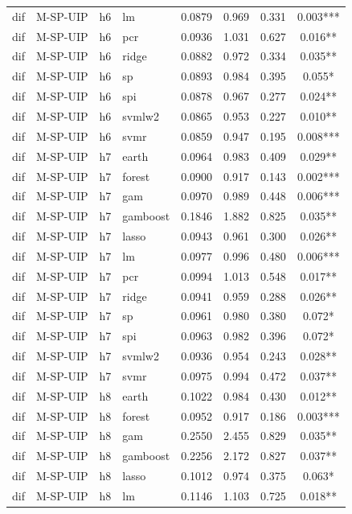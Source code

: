 \begin{ThreePartTable}
\begin{longtable}[t]{llclcccc}
dif & M-SP-UIP & h6 & lm & 0.0879 & 0.969 & 0.331 & 0.003***\\
dif & M-SP-UIP & h6 & pcr & 0.0936 & 1.031 & 0.627 & 0.016**\\
dif & M-SP-UIP & h6 & ridge & 0.0882 & 0.972 & 0.334 & 0.035**\\
dif & M-SP-UIP & h6 & sp & 0.0893 & 0.984 & 0.395 & 0.055*\\
dif & M-SP-UIP & h6 & spi & 0.0878 & 0.967 & 0.277 & 0.024**\\
dif & M-SP-UIP & h6 & svmlw2 & 0.0865 & 0.953 & 0.227 & 0.010**\\
dif & M-SP-UIP & h6 & svmr & 0.0859 & 0.947 & 0.195 & 0.008***\\
\addlinespace
dif & M-SP-UIP & h7 & earth & 0.0964 & 0.983 & 0.409 & 0.029**\\
dif & M-SP-UIP & h7 & forest & 0.0900 & 0.917 & 0.143 & 0.002***\\
dif & M-SP-UIP & h7 & gam & 0.0970 & 0.989 & 0.448 & 0.006***\\
dif & M-SP-UIP & h7 & gamboost & 0.1846 & 1.882 & 0.825 & 0.035**\\
dif & M-SP-UIP & h7 & lasso & 0.0943 & 0.961 & 0.300 & 0.026**\\
dif & M-SP-UIP & h7 & lm & 0.0977 & 0.996 & 0.480 & 0.006***\\
dif & M-SP-UIP & h7 & pcr & 0.0994 & 1.013 & 0.548 & 0.017**\\
dif & M-SP-UIP & h7 & ridge & 0.0941 & 0.959 & 0.288 & 0.026**\\
dif & M-SP-UIP & h7 & sp & 0.0961 & 0.980 & 0.380 & 0.072*\\
dif & M-SP-UIP & h7 & spi & 0.0963 & 0.982 & 0.396 & 0.072*\\
dif & M-SP-UIP & h7 & svmlw2 & 0.0936 & 0.954 & 0.243 & 0.028**\\
dif & M-SP-UIP & h7 & svmr & 0.0975 & 0.994 & 0.472 & 0.037**\\
\addlinespace
dif & M-SP-UIP & h8 & earth & 0.1022 & 0.984 & 0.430 & 0.012**\\
dif & M-SP-UIP & h8 & forest & 0.0952 & 0.917 & 0.186 & 0.003***\\
dif & M-SP-UIP & h8 & gam & 0.2550 & 2.455 & 0.829 & 0.035**\\
dif & M-SP-UIP & h8 & gamboost & 0.2256 & 2.172 & 0.827 & 0.037**\\
dif & M-SP-UIP & h8 & lasso & 0.1012 & 0.974 & 0.375 & 0.063*\\
dif & M-SP-UIP & h8 & lm & 0.1146 & 1.103 & 0.725 & 0.018**\\

\end{longtable}
\end{ThreePartTable}
